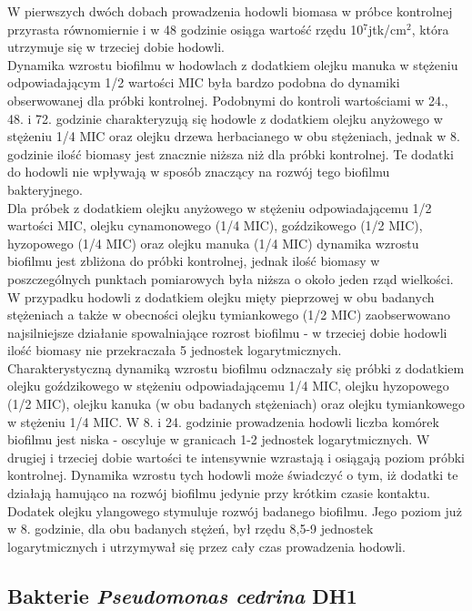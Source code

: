 \documentclass[11pt,a4paper]{report}
\begin{document}
\clearpage
W pierwszych dwóch dobach prowadzenia hodowli biomasa w próbce kontrolnej przyrasta równomiernie i w 48 godzinie osiąga wartość rzędu 10$^7$jtk/cm$^2$, która utrzymuje się w trzeciej dobie hodowli.\\
Dynamika wzrostu biofilmu w hodowlach z dodatkiem olejku manuka w stężeniu odpowiadającym 1/2 wartości MIC była bardzo podobna do dynamiki obserwowanej dla próbki kontrolnej. Podobnymi do kontroli wartościami w 24., 48. i 72. godzinie charakteryzują się hodowle z dodatkiem olejku anyżowego w stężeniu 1/4 MIC oraz olejku drzewa herbacianego w obu stężeniach, jednak w 8. godzinie ilość biomasy jest znacznie niższa niż dla próbki kontrolnej.
Te dodatki do hodowli nie wpływają w sposób znaczący na rozwój tego biofilmu bakteryjnego.\\
Dla próbek z dodatkiem olejku anyżowego w stężeniu odpowiadającemu 1/2 wartości MIC, olejku cynamonowego (1/4 MIC), goździkowego (1/2 MIC), hyzopowego (1/4 MIC) oraz olejku manuka (1/4 MIC) dynamika wzrostu biofilmu jest zbliżona do próbki kontrolnej, jednak ilość biomasy w poszczególnych punktach pomiarowych była niższa o około jeden rząd wielkości.\\
W przypadku hodowli z dodatkiem olejku mięty pieprzowej w obu badanych stężeniach a także w obecności olejku tymiankowego (1/2 MIC) zaobserwowano najsilniejsze działanie spowalniające rozrost biofilmu - w trzeciej dobie hodowli ilość biomasy nie przekraczała 5 jednostek logarytmicznych.\\
Charakterystyczną dynamiką wzrostu biofilmu odznaczały się próbki z dodatkiem olejku goździkowego w stężeniu odpowiadającemu 1/4 MIC, olejku hyzopowego (1/2 MIC), olejku kanuka (w obu badanych stężeniach) oraz olejku tymiankowego w stężeniu 1/4 MIC. W 8. i 24. godzinie prowadzenia hodowli liczba komórek biofilmu jest niska - oscyluje w granicach 1-2 jednostek logarytmicznych. W drugiej i trzeciej dobie wartości te intensywnie wzrastają i osiągają poziom próbki kontrolnej. Dynamika wzrostu tych hodowli może świadczyć o tym, iż dodatki te działają hamująco na rozwój biofilmu jedynie przy krótkim czasie kontaktu.\\
Dodatek olejku ylangowego stymuluje rozwój badanego biofilmu. Jego poziom już w 8. godzinie, dla obu badanych stężeń, był rzędu 8,5-9 jednostek logarytmicznych i utrzymywał się przez cały czas prowadzenia hodowli.\\

\clearpage
\subsection{Bakterie \textit{Pseudomonas cedrina} DH1}
\end{document}
